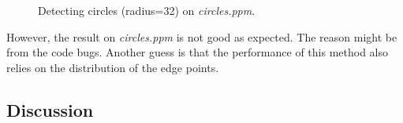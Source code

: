 \documentclass[paper=a4, fontsize=11pt]{scrartcl}
\numberwithin{equation}{section}		%
\numberwithin{figure}{section}			%
\begin{document}
\begin{figure}[h]
\centering
{}
\caption{Detecting circles (radius=32) on \emph{circles.ppm}.}
\label{fig:hough:circle:32:weighted_vote}
\end{figure}

However, the result on \emph{circles.ppm} is not good as expected.
The reason might be from the code bugs.
Another guess is that the performance of this method also relies on the distribution of the edge points.

\subsection{Discussion}
\end{document}

